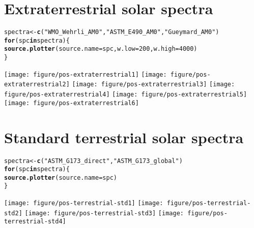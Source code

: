 \documentclass{article}\usepackage[]{graphicx}\usepackage[]{color}
\makeatletter
\newcommand{\hlnum}[1]{\textcolor[rgb]{0.686,0.059,0.569}{#1}}%
\newcommand{\hlstr}[1]{\textcolor[rgb]{0.192,0.494,0.8}{#1}}%
\newcommand{\hlstd}[1]{\textcolor[rgb]{0.345,0.345,0.345}{#1}}%
\newcommand{\hlkwa}[1]{\textcolor[rgb]{0.161,0.373,0.58}{\textbf{#1}}}%
\newcommand{\hlkwb}[1]{\textcolor[rgb]{0.69,0.353,0.396}{#1}}%
\newcommand{\hlkwc}[1]{\textcolor[rgb]{0.333,0.667,0.333}{#1}}%
\newcommand{\hlkwd}[1]{\textcolor[rgb]{0.737,0.353,0.396}{\textbf{#1}}}%
\newenvironment{kframe}{%
 \def\at@end@of@kframe{}%
 \ifinner\ifhmode%
  \def\at@end@of@kframe{\end{minipage}}%
  \begin{minipage}{\columnwidth}%
 \fi\fi%
 \def\FrameCommand##1{\hskip\@totalleftmargin \hskip-\fboxsep
 \colorbox{shadecolor}{##1}\hskip-\fboxsep
     \hskip-\linewidth \hskip-\@totalleftmargin \hskip\columnwidth}%
 \MakeFramed {\advance\hsize-\width
   \@totalleftmargin\z@ \linewidth\hsize
   \@setminipage}}%
 {\par\unskip\endMakeFramed%
 \at@end@of@kframe}
\newenvironment{knitrout}{}{} %
\makeatother
\begin{document}
\section{Extraterrestrial solar spectra}

\begin{knitrout}\footnotesize
{}\color{fgcolor}\begin{kframe}
\begin{alltt}
\hlstd{spectra} \hlkwb{<-} \hlkwd{c}\hlstd{(}\hlstr{"WMO_Wehrli_AM0"}\hlstd{,} \hlstr{"ASTM_E490_AM0"}\hlstd{,} \hlstr{"Gueymard_AM0"}\hlstd{)}
\hlkwa{for} \hlstd{(spc} \hlkwa{in} \hlstd{spectra) \{}
    \hlkwd{source.plotter}\hlstd{(}\hlkwc{source.name} \hlstd{= spc,} \hlkwc{w.low} \hlstd{=} \hlnum{200}\hlstd{,} \hlkwc{w.high} \hlstd{=} \hlnum{4000}\hlstd{)}
\hlstd{\}}
\end{alltt}
\end{kframe}

{\centering \texttt{[image: figure/pos-extraterrestrial1]} 
\texttt{[image: figure/pos-extraterrestrial2]} 
\texttt{[image: figure/pos-extraterrestrial3]} 
\texttt{[image: figure/pos-extraterrestrial4]} 
\texttt{[image: figure/pos-extraterrestrial5]} 
\texttt{[image: figure/pos-extraterrestrial6]} 

}



\end{knitrout}


\section{Standard terrestrial solar spectra}

\begin{knitrout}\footnotesize
{}\color{fgcolor}\begin{kframe}
\begin{alltt}
\hlstd{spectra} \hlkwb{<-} \hlkwd{c}\hlstd{(}\hlstr{"ASTM_G173_direct"}\hlstd{,} \hlstr{"ASTM_G173_global"}\hlstd{)}
\hlkwa{for} \hlstd{(spc} \hlkwa{in} \hlstd{spectra) \{}
    \hlkwd{source.plotter}\hlstd{(}\hlkwc{source.name} \hlstd{= spc)}
\hlstd{\}}
\end{alltt}
\end{kframe}

{\centering \texttt{[image: figure/pos-terrestrial-std1]} 
\texttt{[image: figure/pos-terrestrial-std2]} 
\texttt{[image: figure/pos-terrestrial-std3]} 
\texttt{[image: figure/pos-terrestrial-std4]} 

}



\end{knitrout}
\end{document}
